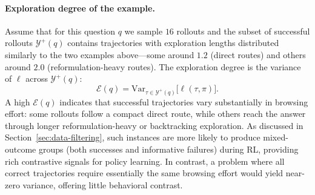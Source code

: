 \paragraph{Exploration degree of the example.}
Assume that for this question $q$ we sample $16$ rollouts and the subset of successful rollouts $\mathcal{Y}^{+}(q)$ contains trajectories with exploration lengths distributed similarly to the two examples above---some around $1.2$ (direct routes) and others around $2.0$ (reformulation-heavy routes). The exploration degree is the variance of $\ell$ across $\mathcal{Y}^{+}(q)$:
\begin{equation}
\mathcal{E}(q) = \mathrm{Var}_{\tau \in \mathcal{Y}^{+}(q)}\big[\ell(\tau,\pi)\big].
\end{equation}
A high $\mathcal{E}(q)$ indicates that successful trajectories vary substantially in browsing effort: some rollouts follow a compact direct route, while others reach the answer through longer reformulation-heavy or backtracking exploration. As discussed in Section~\ref{sec:data-filtering}, such instances are more likely to produce mixed-outcome groups (both successes and informative failures) during RL, providing rich contrastive signals for policy learning. In contrast, a problem where all correct trajectories require essentially the same browsing effort would yield near-zero variance, offering little behavioral contrast.